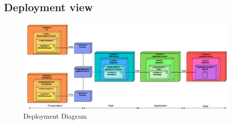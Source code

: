 \documentclass[table, 12pt]{article}
\begin{document}
\subsection{Deployment view}
\begin{center}
    \begin{figure}[H]
        \includegraphics[scale=0.45, center]{assets/deployment_diagram.png}
        \caption{Deployment Diagram}
        \label{fig: deployment_diagram}
    \end{figure}
\end{center}
\end{document}
